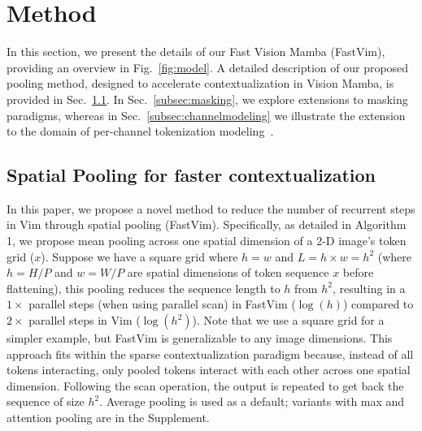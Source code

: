 \section{Method}
\label{sec:method}



In this section, we present the details of our Fast Vision Mamba (FastVim), providing an overview in Fig.~\ref{fig:model}. A detailed description of our proposed pooling method, designed to accelerate contextualization in Vision Mamba, is provided in Sec.~\ref{subsec:pooling}. In Sec.~\ref{subsec:masking}, we explore extensions to masking paradigms, whereas in Sec.~\ref{subsec:channelmodeling} we illustrate the extension to the domain of per-channel tokenization modeling~\cite{channelvit}. 



\subsection{Spatial Pooling for faster contextualization}
\label{subsec:pooling}

In this paper, we propose a novel method to reduce the number of recurrent steps in Vim through spatial pooling (FastVim). Specifically, as detailed in Algorithm 1, we propose mean pooling across one spatial dimension of a 2-D image's token grid ($x$). Suppose we have a square grid where $h=w$ and $L=h \times w=h^2$ (where $h=H/P$ and $w=W/P$ are spatial dimensions of token sequence $x$ before flattening), this pooling reduces the sequence length to $h$ from $h^2$, resulting in a $1\times$ parallel steps (when using parallel scan) in FastVim ($\log(h)$) compared to $2\times$ parallel steps in Vim ($\log(h^2)$). Note that we use a square grid for a simpler example, but FastVim is generalizable to any image dimensions. This approach fits within the sparse contextualization paradigm because, instead of all tokens interacting, only pooled tokens interact with each other across one spatial dimension. Following the scan operation, the output is repeated to get back the sequence of size $h^2$. 
Average pooling is used as a default; variants with max and attention pooling are in the Supplement.

